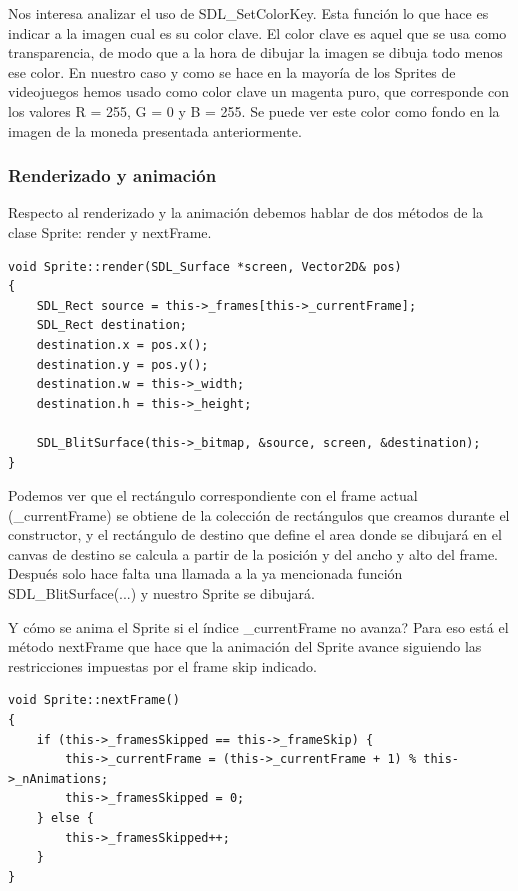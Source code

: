 \documentclass[parskip=half*]{scrartcl}
\begin{document}
			Nos interesa analizar el uso de SDL\_SetColorKey. Esta funci\'on lo que hace es indicar a la imagen cual es su color clave. El color clave es aquel que se usa como transparencia, de modo que a la hora de dibujar la imagen se dibuja todo menos ese color. En nuestro caso y como se hace en la mayor\'ia de los Sprites de videojuegos hemos usado como color clave un magenta puro, que corresponde con los valores R = 255, G = 0 y B = 255. Se puede ver este color como fondo en la imagen de la moneda presentada anteriormente.

		\subsubsection{Renderizado y animaci\'on}
			Respecto al renderizado y la animaci\'on debemos hablar de dos m\'etodos de la clase Sprite: render y nextFrame.

			\begin{lstlisting}
void Sprite::render(SDL_Surface *screen, Vector2D& pos)
{
    SDL_Rect source = this->_frames[this->_currentFrame];
    SDL_Rect destination;
    destination.x = pos.x();
    destination.y = pos.y();
    destination.w = this->_width;
    destination.h = this->_height;
    
    SDL_BlitSurface(this->_bitmap, &source, screen, &destination);
}
			\end{lstlisting}

			Podemos ver que el rect\'angulo correspondiente con el frame actual (\_currentFrame) se obtiene de la colecci\'on de rect\'angulos que creamos durante el constructor, y el rect\'angulo de destino que define el area donde se dibujar\'a en el canvas de destino se calcula a partir de la posici\'on y del ancho y alto del frame. Despu\'es solo hace falta una llamada a la ya mencionada funci\'on SDL\_BlitSurface(...) y nuestro Sprite se dibujar\'a.

			\textquestiondown Y c\'omo se anima el Sprite si el \'indice \_currentFrame no avanza? Para eso est\'a el m\'etodo nextFrame que hace que la animaci\'on del Sprite avance siguiendo las restricciones impuestas por el frame skip indicado.

			\begin{lstlisting}
void Sprite::nextFrame()
{
    if (this->_framesSkipped == this->_frameSkip) {
        this->_currentFrame = (this->_currentFrame + 1) % this->_nAnimations;
        this->_framesSkipped = 0;
    } else {
        this->_framesSkipped++;
    }
}
			\end{lstlisting}
\end{document}
